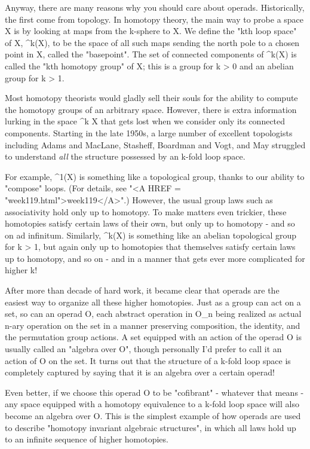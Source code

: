 Anyway, there are many reasons why you should care about operads.
Historically, the first come from topology.  In homotopy theory, the
main way to probe a space X is by looking at maps from the k-sphere to
X.  We define the "kth loop space" of X, \Omega ^{k}(X),
to be the space of all such maps sending the north pole to a chosen
point in X, called the "basepoint".  The set of connected
components of \Omega ^{k}(X) is called the "kth homotopy
group" of X; this is a group for k > 0 and an abelian group for
k > 1.

Most homotopy theorists would gladly sell their souls for the ability to
compute the homotopy groups of an arbitrary space.  However, there is
extra information lurking in the space \Omega ^{k} X that gets lost when
we consider only its connected components.  Starting in the late 1950s,
a large number of excellent topologists including Adams and MacLane,
Stasheff, Boardman and Vogt, and May struggled to understand \emph{all} the 
structure possessed by an k-fold loop space.  


For example, \Omega ^{1}(X) is something like a topological group,
thanks to our ability to "compose" loops.  (For details, see
"<A HREF = "week119.html">week119</A>".)  However, the usual
group laws such as associativity hold only up to homotopy.  To make
matters even trickier, these homotopies satisfy certain laws of their
own, but only up to homotopy - and so on ad infinitum.  Similarly,
\Omega ^{k}(X) is something like an abelian topological group for
k > 1, but again only up to homotopies that themselves satisfy
certain laws up to homotopy, and so on - and in a manner that gets ever
more complicated for higher k!

After more than decade of hard work, it became clear that operads are
the easiest way to organize all these higher homotopies.  Just as a
group can act on a set, so can an operad O, each abstract operation 
in O_{n} being realized as actual n-ary operation on the set in a
manner preserving composition, the identity, and the permutation group
actions.  A set equipped with an action of the operad O is usually
called an "algebra over O", though personally I'd prefer to call
it an action of O on the set.  It turns out that the structure of a
k-fold loop space is completely captured by saying that it is an
algebra over a certain operad!  

Even better, if we choose this operad O to be "cofibrant" - whatever
that means - any space equipped with a homotopy equivalence to a k-fold 
loop space will also become an algebra over O.  This is the simplest 
example of how operads are used to describe "homotopy invariant algebraic 
structures", in which all laws hold up to an infinite sequence of higher 
homotopies.  


